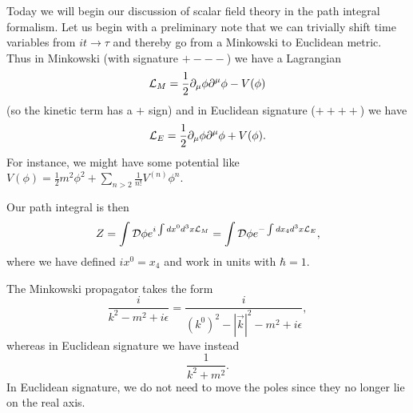 Today we will begin our discussion of scalar field theory in the path integral formalism. Let us begin with a preliminary note that we can trivially shift time variables from $i t\to \tau$ and thereby go from a Minkowski to Euclidean metric. Thus in Minkowski (with signature $+---$) we have a Lagrangian
\begin{equation*}
    \mathcal L_M=\frac{1}{2} \partial_\mu \phi \partial^\mu \phi -V(\phi)
\end{equation*}
(so the kinetic term has a $+$ sign) and in Euclidean signature ($++++$) we have
\begin{equation*}
    \mathcal L_E=\frac{1}{2} \partial_\mu \phi \partial^\mu \phi+ V(\phi).
\end{equation*}
For instance, we might have some potential like $V(\phi)=\frac{1}{2} m^2 \phi^2 +\sum_{n>2} \frac{1}{n!} V^{(n)} \phi^n$.

Our path integral is then
\begin{equation}
    Z=\int \mathcal{D} \phi e^{i\int dx^0 d^3x \mathcal L_M}= \int \mathcal{D} \phi e^{-\int dx_4 d^3x \mathcal L_E},
\end{equation}
where we have defined $ix^0=x_4$ and work in units with $\hbar =1$.

The Minkowski propagator takes the form
\begin{equation}
    \frac{i}{k^2-m^2+i\epsilon} = \frac{i}{(k^0)^2 -|\vec k|^2 -m^2 +i\epsilon},
\end{equation}
whereas in Euclidean signature we have instead
\begin{equation}
    \frac{1}{k^2+m^2}.
\end{equation}
In Euclidean signature, we do not need to move the poles since they no longer lie on the real axis.

